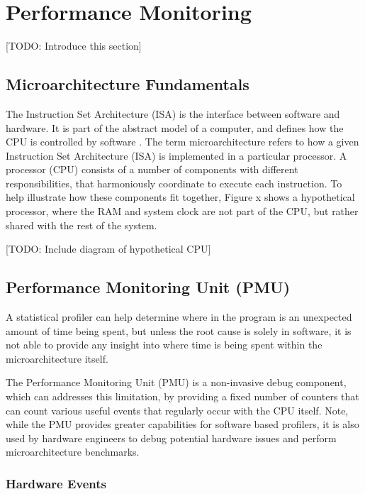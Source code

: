 {\section{Performance Monitoring}

[TODO: Introduce this section]

\subsection{Microarchitecture Fundamentals}

The Instruction Set Architecture (ISA) is the interface between software and hardware. It is part of the abstract model of a computer, and defines how the CPU is controlled by software \cite{GlossArmISA}. The term microarchitecture refers to how a given Instruction Set Architecture (ISA) is implemented in a particular processor. A processor (CPU) consists of a number of components with different responsibilities, that harmoniously coordinate to execute each instruction. To help illustrate how these components fit together, Figure x shows a hypothetical processor, where the RAM and system clock are not part of the CPU, but rather shared with the rest of the system.

[TODO: Include diagram of hypothetical CPU]

\subsection{Performance Monitoring Unit (PMU)}

A statistical profiler can help determine where in the program is an unexpected amount of time being spent, but unless the root cause is solely in software, it is not able to provide any insight into where time is being spent within the microarchitecture itself.

The Performance Monitoring Unit (PMU) is a non-invasive debug component, which can addresses this limitation, by providing a fixed number of counters that can count various useful events that regularly occur with the CPU itself. Note, while the PMU provides greater capabilities for software based profilers, it is also used by hardware engineers to debug potential hardware issues and perform microarchitecture benchmarks.

\subsubsection{Hardware Events}

}
